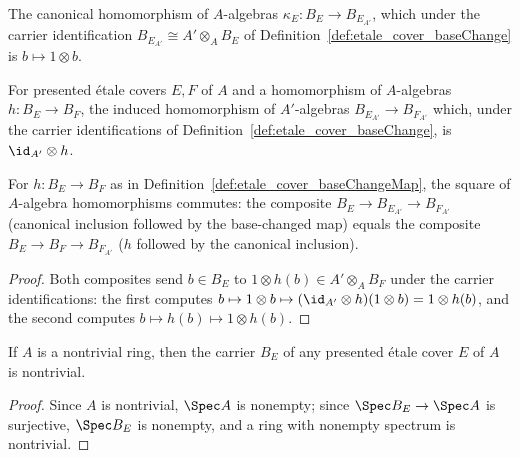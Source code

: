 \begin{definition}
  \label{def:etale_cover_baseChangeInclude}
  \leanok
  The canonical homomorphism of \(A\)-algebras \(\kappa_E \colon B_E \to B_{E_{A'}}\), which
  under the carrier identification \(B_{E_{A'}} \cong A' \otimes_A B_E\) of
  Definition~\ref{def:etale_cover_baseChange} is \(b \mapsto 1 \otimes b\).
\end{definition}

\begin{definition}
  \label{def:etale_cover_baseChangeMap}
  \leanok
  For presented \'etale covers \(E, F\) of \(A\) and a homomorphism of \(A\)-algebras
  \(h \colon B_E \to B_F\), the induced homomorphism of \(A'\)-algebras \(B_{E_{A'}} \to
  B_{F_{A'}}\) which, under the carrier identifications of
  Definition~\ref{def:etale_cover_baseChange}, is \(\id_{A'} \otimes h\).
\end{definition}

\begin{lemma}
  \label{lem:etale_cover_baseChangeMap_comp_baseChangeInclude}
  \leanok
  For \(h \colon B_E \to B_F\) as in Definition~\ref{def:etale_cover_baseChangeMap}, the square
  of \(A\)-algebra homomorphisms commutes: the composite \(B_E \to B_{E_{A'}} \to B_{F_{A'}}\)
  (canonical inclusion followed by the base-changed map) equals the composite
  \(B_E \to B_F \to B_{F_{A'}}\) (\(h\) followed by the canonical inclusion).
\end{lemma}
\begin{proof}
  \leanok
  Both composites send \(b \in B_E\) to \(1 \otimes h(b) \in A' \otimes_A B_F\) under the
  carrier identifications: the first computes \(b \mapsto 1 \otimes b \mapsto
  (\id_{A'}\otimes h)(1 \otimes b) = 1 \otimes h(b)\), and the second computes
  \(b \mapsto h(b) \mapsto 1 \otimes h(b)\).
\end{proof}

\begin{lemma}
  \label{lem:etale_cover_nontrivial_carrier}
  \leanok
  If \(A\) is a nontrivial ring, then the carrier \(B_E\) of any presented \'etale cover \(E\)
  of \(A\) is nontrivial.
\end{lemma}
\begin{proof}
  \leanok
  Since \(A\) is nontrivial, \(\Spec A\) is nonempty; since \(\Spec B_E \to \Spec A\) is
  surjective, \(\Spec B_E\) is nonempty, and a ring with nonempty spectrum is nontrivial.
\end{proof}

